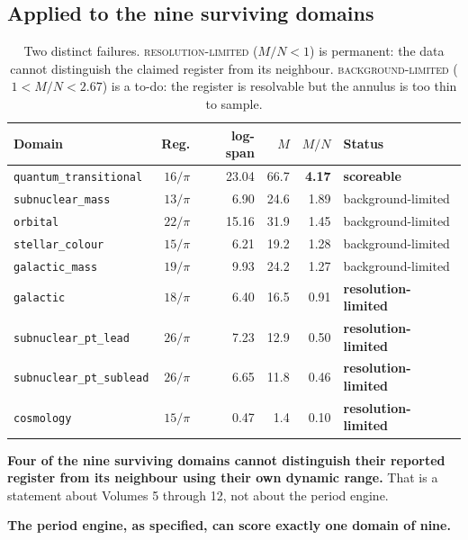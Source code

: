 \documentclass[11pt, letterpaper, openany]{book}
\begin{document}
\subsection{Applied to the nine surviving domains}

\begin{table}[H]
\centering
\small
\begin{tabular}{@{}lrrrrl@{}}
\toprule
\textbf{Domain} & \textbf{Reg.} & \textbf{log-span} & $M$ & $M/N$ & \textbf{Status} \\
\midrule
\texttt{quantum\_transitional} & $16/\pi$ & 23.04 & 66.7 & \textbf{4.17} & \textbf{scoreable} \\
\texttt{subnuclear\_mass} & $13/\pi$ & 6.90 & 24.6 & 1.89 & background-limited \\
\texttt{orbital} & $22/\pi$ & 15.16 & 31.9 & 1.45 & background-limited \\
\texttt{stellar\_colour} & $15/\pi$ & 6.21 & 19.2 & 1.28 & background-limited \\
\texttt{galactic\_mass} & $19/\pi$ & 9.93 & 24.2 & 1.27 & background-limited \\
\texttt{galactic} & $18/\pi$ & 6.40 & 16.5 & 0.91 & \textbf{resolution-limited} \\
\texttt{subnuclear\_pt\_lead} & $26/\pi$ & 7.23 & 12.9 & 0.50 & \textbf{resolution-limited} \\
\texttt{subnuclear\_pt\_sublead} & $26/\pi$ & 6.65 & 11.8 & 0.46 & \textbf{resolution-limited} \\
\texttt{cosmology} & $15/\pi$ & 0.47 & 1.4 & 0.10 & \textbf{resolution-limited} \\
\bottomrule
\end{tabular}
\caption{Two distinct failures. \textsc{resolution-limited} ($M/N < 1$) is permanent: the data
cannot distinguish the claimed register from its neighbour. \textsc{background-limited}
($1 < M/N < 2.67$) is a to-do: the register is resolvable but the annulus is too thin to sample.}
\end{table}

\begin{warningbox}
\textbf{Four of the nine surviving domains cannot distinguish their reported register from its
neighbour using their own dynamic range.} That is a statement about Volumes 5 through 12, not
about the period engine.

\medskip
\noindent \textbf{The period engine, as specified, can score exactly one domain of nine.}
\end{warningbox}
\end{document}
